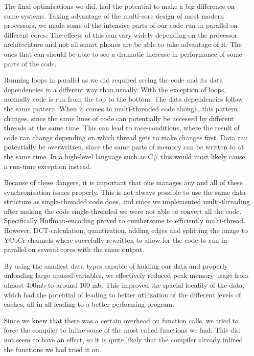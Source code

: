 The final optimisations we did, had the potential to make a big difference on some systems.
Taking advantage of the multi-core design of most modern processors, we made some of the intensive parts of our code run in parallel on different cores.
The effects of this can vary widely depending on the processor architechture and not all smart phones are be able to take advantage of it.
The ones that can should be able to see a dramatic increase in performance of some parts of the code.

Running loops in parallel as we did required seeing the code and its data dependencies in a different way than usually.
With the exception of loops, normally code is run from the top to the bottom.
The data dependencies follow the same pattern.
When it comes to multi-threaded code though, this pattern changes, since the same lines of code can potentially be accessed by different threads at the same time.
This can lead to race-conditions, where the result of code can change depending on which thread gets to make changes first.
Data can potentially be overwritten, since the same parts of memory can be written to at the same time.
In a high-level language such as C\# this would most likely cause a run-time exception instead.

Because of these dangers, it is important that one manages any and all of these synchronisation issues properly.
This is not always possible to use the same data-structure as single-threaded code does, and since we implemented multi-threading after making the code single-threaded we were not able to convert all the code.
Specifically Huffman-encoding proved to cumbersome to efficiently multi-thread.
However, DCT-calculation, quantization, adding edges and splitting the image to YCbCr-channels where succefully rewritten to allow for the code to run in parallel on several cores with the same output.

By using the smallest data types capable of holding our data and properly unloading large unused variables, we effectively reduced peak memory usage from almost 400mb to around 100 mb.
This improved the spacial locality of the data, which had the potential of leading to better utilization of the different levels of caches, all in all leading to a better performing program.

Since we knew that there was a certain overhead on function calls, we tried to force the compiler to inline some of the most called functions we had. 
This did not seem to have an effect, so it is quite likely that the compiler already inlined the functions we had tried it on.

